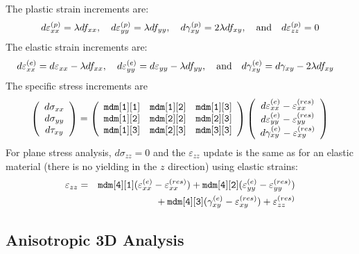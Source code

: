 \documentclass[11pt]{article}
\def\code#1{{\small\tt #1}}
\def\e#1{\varepsilon_{#1}}
\def\er#1{\varepsilon_{#1}^{(res)}}
\def\g#1{\gamma_{#1}}
\def\s#1{\sigma_{#1}}
\def\t#1{\tau_{#1}}
\def\vvec#1#2#3{\left(\begin{array}{ccc} #1 \\ #2 \\ #3 \end{array}\right)}
\begin{document}
The plastic strain increments are:
\begin{equation}
       d\varepsilon_{xx}^{(p)} = \lambda df_{xx}, \quad
       d\varepsilon_{yy}^{(p)} = \lambda df_{yy}, \quad
       d\gamma_{xy}^{(p)} = 2 \lambda df_{xy}, \quad  {\rm and} \quad
       d\varepsilon_{zz}^{(p)} = 0
\end{equation}
The elastic strain increments are:
\begin{equation}
       d\varepsilon_{xx}^{(e)} = d\varepsilon_{xx} -\lambda df_{xx}, \quad
       d\varepsilon_{yy}^{(e)} = d\varepsilon_{yy} -\lambda df_{yy}, \quad   {\rm and} \quad
       d\gamma_{xy}^{(e)} = d\gamma_{xy} - 2 \lambda df_{xy} \quad
\end{equation}
The specific stress increments are
\begin{equation}
      \vvec{d\s{xx}}{d\s{yy}}{d\t{xy}} = \left(\begin{array}{ccc}
      		\code{mdm[1][1]} & \code{mdm[1][2]} & \code{mdm[1][3]}  \\
      		\code{mdm[1][2]} & \code{mdm[2][2]} & \code{mdm[2][3]}  \\
      		\code{mdm[1][3]} & \code{mdm[2][3]} & \code{mdm[3][3]} 
           \end{array}\right)
             \vvec{d\varepsilon_{xx}^{(e)}  - \er{xx}}{d\varepsilon_{yy}^{(e)}  -\er{yy}}{d\g{xy}^{(e)}-\er{xy}}
 \end{equation}
For plane stress analysis, $d\sigma_{zz}=0$ and the $\varepsilon_{zz}$ update is the same as for an elastic material (there is no yielding in the $z$ direction) using elastic strains:
\begin{eqnarray}
     \e{zz} & = & \code{mdm[4][1]} (\e{xx}^{(e)} - \er{xx}) +  \code{mdm[4][2]}(\e{yy}^{(e)} -\er{yy}) 
     \nonumber \\
     && \qquad\qquad\mbox{}
                 + \code{mdm[4][3]}(\g{xy}^{(e)}-\er{xy})  + \er{zz}
\end{eqnarray}

\subsection{Anisotropic 3D Analysis}
\end{document}
